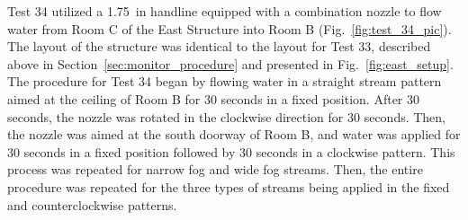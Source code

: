 \documentclass[12pt,oneside]{book}
\begin{document}
Test 34 utilized a 1.75~in handline equipped with a combination nozzle to flow water from Room C of the East Structure into Room B (Fig.~\ref{fig:test_34_pic}). The layout of the structure was identical to the layout for Test 33, described above in Section~\ref{sec:monitor_procedure} and presented in Fig.~\ref{fig:east_setup}. The procedure for Test 34 began by flowing water in a straight stream pattern aimed at the ceiling of Room B for 30 seconds in a fixed position. After 30 seconds, the nozzle was rotated in the clockwise direction for 30 seconds. Then, the nozzle was aimed at the south doorway of Room B, and water was applied for 30 seconds in a fixed position followed by 30 seconds in a clockwise pattern. This process was repeated for narrow fog and wide fog streams. Then, the entire procedure was repeated for the three types of streams being applied in the fixed and counterclockwise patterns.
\end{document}
